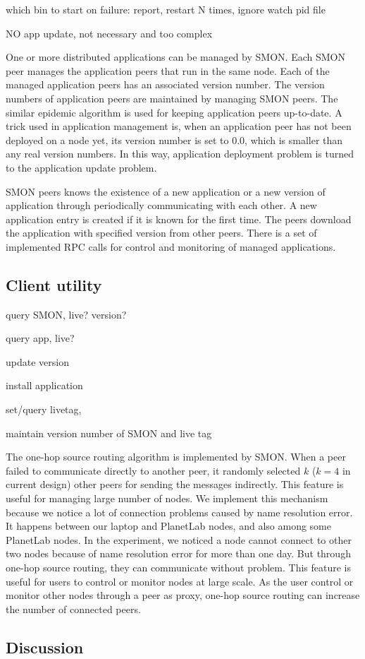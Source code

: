 which bin to start
on failure: report, restart N times, ignore
watch pid file

NO app update, not necessary and too complex

One or more distributed applications can be managed by SMON. Each
SMON peer manages the application peers that run in the same
node. Each of the managed application peers has an associated
version number.  The version numbers of application peers are
maintained by managing SMON peers. The similar epidemic algorithm
is used for keeping application peers up-to-date. A trick used
in application management is, when an application peer has not
been deployed on a node yet, its version number is set to 0.0,
which is smaller than any real version numbers. In this way,
application deployment problem is turned to the application
update problem.

SMON peers knows the existence of a new application or a new
version of application through periodically communicating with each
other. A new application entry is created if it is known for the
first time.  The peers download the application with specified
version from other peers. There is a set of implemented RPC
calls for control and monitoring of managed applications.


\subsection{Client utility}

query SMON, live? version?

query app, live?

update version

install application

set/query livetag, 

maintain version number of SMON and live tag


The one-hop source routing\cite{Gummadi2004} algorithm is
implemented by SMON. When a peer failed to communicate directly
to another peer, it randomly selected $k$ ($k=4$ in current
design) other peers for sending the messages indirectly.  This
feature is useful for managing large number of nodes. We
implement this mechanism because we notice a lot of connection
problems caused by name resolution error. It happens between our
laptop and PlanetLab nodes, and also among some PlanetLab nodes.
In the experiment, we noticed a node cannot connect to other two
nodes because of name resolution error for more than one day.
But through one-hop source routing, they can communicate without
problem. This feature is useful for users to control or monitor
nodes at large scale. As the user control or monitor other nodes
through a peer as proxy, one-hop source routing can increase the
number of connected peers.

\subsection{Discussion}




